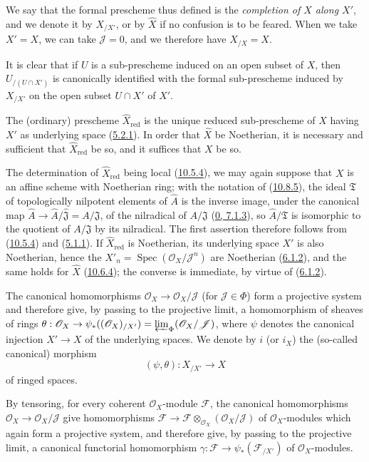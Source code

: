 We say that the formal prescheme thus defined is the
\emph{completion of $X$ along $X'$}, and we denote it by $X_{/X'}$, or by
$\widehat X$ if no confusion is to be feared. When we take
$X'=X$, we can take $\mathscr{J}=0$, and we therefore have $X_{/X}=X$.

It is clear that if $U$ is a sub-prescheme induced on an open subset of
$X$, then $U_{/(U\cap X')}$ is canonically identified with the formal
sub-prescheme induced by $X_{/X'}$ on the open subset $U\cap X'$ of $X'$.

\begin{corollary}[10.8.6]
\label{I.10.8.6}
The (ordinary) prescheme $\widehat X_{\mathrm{red}}$ is the unique
reduced sub-prescheme of $X$ having $X'$ as underlying space
(\hyperref[I.5.2.1]{5.2.1}). In order that $\widehat X$ be Noetherian,
it is necessary and sufficient that $\widehat X_{\mathrm{red}}$ be so,
and it suffices that $X$ be so.
\end{corollary}


The determination of $\widehat X_{\mathrm{red}}$ being local
(\hyperref[I.10.5.4]{10.5.4}), we may again suppose that $X$ is an
affine scheme with Noetherian ring; with the notation of
(\hyperref[I.10.8.5]{10.8.5}), the ideal $\mathfrak{T}$ of
topologically nilpotent elements of $\widehat A$ is the inverse image,
under the canonical map
$\widehat A\to\widehat A/\widehat{\mathfrak{J}}=A/\mathfrak{J}$, of the
nilradical of $A/\mathfrak{J}$
(\hyperref[0.7.1.3]{0, 7.1.3}), so $\widehat A/\mathfrak{T}$ is
isomorphic to the quotient of $A/\mathfrak{J}$ by its nilradical. The
first assertion therefore follows from (\hyperref[I.10.5.4]{10.5.4})
and (\hyperref[I.5.1.1]{5.1.1}). If $\widehat X_{\mathrm{red}}$ is
Noetherian, its underlying space $X'$ is also Noetherian, hence the
$X'_n=\operatorname{Spec}(\mathscr{O}_X/\mathscr{J}^n)$ are Noetherian
(\hyperref[I.6.1.2]{6.1.2}), and the same holds for $\widehat X$
(\hyperref[I.10.6.4]{10.6.4}); the converse is immediate, by virtue
of (\hyperref[I.6.1.2]{6.1.2}).

\begin{env}[10.8.7]
\label{I.10.8.7}
The canonical homomorphisms
$\mathscr{O}_X\to\mathscr{O}_X/\mathscr{J}$ (for
$\mathscr{J}\in\Phi$) form a projective system and therefore give, by
passing to the projective limit, a homomorphism of sheaves of rings
$\theta:\mathscr{O}_X\to\psi_*((\mathscr{O}_X)_{/X'})
=\varprojlim_\Phi(\mathscr{O}_X/\mathscr{J})$, where $\psi$ denotes
the canonical injection $X'\to X$ of the underlying spaces. We denote
by $i$ (or $i_X$) the (so-called canonical) morphism
\[
  (\psi,\theta):X_{/X'}\to X
\]
of ringed spaces.

By tensoring, for every coherent $\mathscr{O}_X$-module
$\mathscr{F}$, the canonical homomorphisms
$\mathscr{O}_X\to\mathscr{O}_X/\mathscr{J}$ give homomorphisms
$\mathscr{F}\to
\mathscr{F}\otimes_{\mathscr{O}_X}(\mathscr{O}_X/\mathscr{J})$ of
$\mathscr{O}_X$-modules which again form a projective system, and
therefore give, by passing to the projective limit, a canonical
functorial homomorphism
$\gamma:\mathscr{F}\to\psi_*(\mathscr{F}_{/X'})$ of
$\mathscr{O}_X$-modules.
\end{env}

